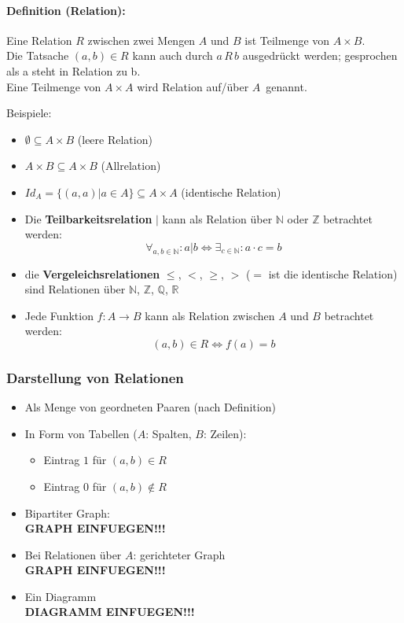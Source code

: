\paragraph{Definition (Relation):}Eine Relation $R$ zwischen zwei Mengen $A$ und $B$ ist Teilmenge von $A\times B$.\\
Die Tatsache $(a,b)\in R$ kann auch durch $a\,R\,b$ ausgedrückt werden; gesprochen als \glqq a steht in Relation zu b\grqq .\\
Eine Teilmenge von $A\times A$ wird \glqq Relation auf/über $A$\grqq\ genannt.

Beispiele:
\begin{itemize}
\item $\emptyset \subseteq A\times B$ (leere Relation)
\item $A\times B \subseteq A\times B$ (Allrelation)
\item $Id_A = \{(a,a) | a\in A\} \subseteq A\times A$ (identische Relation)
\item Die \textbf{Teilbarkeitsrelation} $\mid$ kann als Relation über $\mathbb{N}$ oder $\mathbb{Z}$ betrachtet werden:
\[
\forall_{a,b\in\mathbb{N}}: a|b \Leftrightarrow \exists_{c\in\mathbb{N}}: a\cdot c = b
\]
\item die \textbf{Vergeleichsrelationen} $\leq$, $<$, $\geq$, $>$ ($=$ ist die identische Relation) sind Relationen über $\mathbb{N}$, $\mathbb{Z}$, $\mathbb{Q}$, $\mathbb{R}$
\item Jede Funktion $f:A\rightarrow B$ kann als Relation zwischen $A$ und $B$ betrachtet werden:
\[
(a,b)\in R \Leftrightarrow f(a)=b
\]
\end{itemize}

\subsubsection{Darstellung von Relationen}
\begin{itemize}
\item Als Menge von geordneten Paaren (nach Definition)
\item In Form von Tabellen ($A$: Spalten, $B$: Zeilen):
\begin{itemize}
\item Eintrag $1$ für $(a,b)\in R$
\item Eintrag $0$ für $(a,b)\not\in R$
\end{itemize}
\item Bipartiter Graph:\\
\textbf{GRAPH EINFUEGEN!!!}
\item Bei Relationen über $A$: gerichteter Graph\\
\textbf{GRAPH EINFUEGEN!!!}
\item Ein Diagramm\\
\textbf{DIAGRAMM EINFUEGEN!!!}
\end{itemize}

